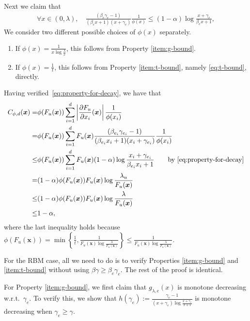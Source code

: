 \documentclass[11pt]{amsart}
\theoremstyle{definition}
\theoremstyle{remark}
\begin{document}
Next we claim that
\begin{align}\label{eq:property-for-decay}
    \forall x \in (0,\lambda), \quad \frac{(\beta_{e}\gamma_{e}-1)}{(\beta_{e}x+1)(x+\gamma_{e})} \frac{1}{\phi(x)}\leq (1-\alpha)\log \frac{x+\gamma_e}{\beta_e x+1},
\end{align}
We consider two different possible choices of $\phi(x)$ separately.
\begin{enumerate}
  \item If $\phi(x)=\frac{1}{x\log\frac{\lambda}{x}}$, this follows from Property \eqref{item:g-bound}.
  \item If $\phi(x)=\frac{1}{t}$, this follows from Property \eqref{item:t-bound}, namely \eqref{eq:t-bound}, directly.    
\end{enumerate}

Having verified~\eqref{eq:property-for-decay},
we have that
\begin{align*}
C_{\phi,d}(\boldsymbol{x}) =& \phi(F_u(\boldsymbol{x})) \sum_{i=1}^d \left\vert  \frac{\partial F_u}{\partial x_i}(\boldsymbol{x})  \right\vert \frac{1}{\phi(x_i)}\\
=&\phi(F_u(\boldsymbol{x})) \sum_{i=1}^d F_u(\boldsymbol{x}) \frac{(\beta_{e_i}\gamma_{e_i}-1)}{(\beta_{e_i}x_i+1)(x_i+\gamma_{e_i})} \frac{1}{\phi(x_i)}\\
\leq &\phi(F_u(\boldsymbol{x})) \sum_{i=1}^d F_u(\boldsymbol{x})(1-\alpha)\log \frac{x_i+\gamma_{e_i}}{\beta_{e_i} x_i+1}\qquad \text{by~\eqref{eq:property-for-decay}}\\
=&(1-\alpha)\phi(F_u(\boldsymbol{x})) F_u(\boldsymbol{x})\log \frac{\lambda_u}{F_u(\boldsymbol{x})}\\
\leq& (1-\alpha)\phi(F_u(\boldsymbol{x})) F_u(\boldsymbol{x})\log \frac{\lambda}{F_u(\boldsymbol{x})}\\
\leq& 1-\alpha,
\end{align*}
where the last inequality holds because $\phi(F_u(\boldsymbol{x}))=\min\left \{ \frac{1}{t},\frac{1}{F_u(\boldsymbol{x})\log \frac{\lambda}{F_u(\boldsymbol{x})}}\right \}\leq \frac{1}{F_u(\boldsymbol{x})\log \frac{\lambda}{F_u(\boldsymbol{x})}}$.

For the RBM case, all we need to do is to verify Properties \eqref{item:g-bound} and \eqref{item:t-bound} without using $\beta\gamma\ge\beta_e\gamma_e$.
The rest of the proof is identical.

For Property \eqref{item:g-bound},
we first claim that $g_{\lambda,e}(x)$ is monotone decreasing w.r.t.\ $\gamma_e$. 
To verify this, we show that $h(\gamma_e):=\frac{\gamma_e-1}{(x+\gamma_e)\log \frac{x+\gamma_e}{x+1}}$ is monotone decreasing when $\gamma_e\geq \gamma$.
\end{document}
